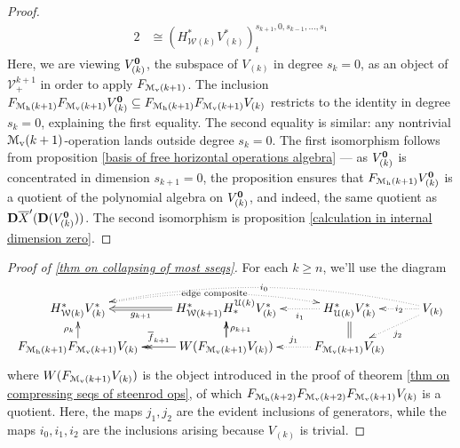 \documentclass[11pt]{amsart}
\theoremstyle{plain}
\theoremstyle{definition}
\newcommand{\calW}{\mathcal{W}}
\newcommand{\calU}{\mathcal{U}}
\newcommand{\calV}{\mathcal{V}}
\newcommand{\calM}{\mathcal{M}}
\newcommand{\calMv}{\mathcal{M}_\textup{v}}
\newcommand{\calMh}{\mathcal{M}_\textup{h}}
\theoremstyle{plain}
\newcommand{\vect}[2]{\calV^{#1}_{#2}}
\newcommand{\UEAX}{\overline{X}'}%
\newcommand{\dual}{\mathbf{D}}
\begin{document}
\begin{Calculations of HWn for n nonzero}
\begin{proof}
\begin{alignat*}{2}
&\cong (H^*_{\calW(k)}V^*_{(k)})^{s_{k+1},0,s_{k-1},\ldots,s_1}_{t}
\end{alignat*}
Here, we are viewing $V_{(k)}^{\textbf{\textup{0}}}$, the subspace of $V_{(k)}$ in degree $s_k=0$, as an object of $\vect{k+1}{+}$ in order to apply $F_{\calMv(k+1)}$. The inclusion $F_{\calM_{\textup{h}}(k+1)}F_{\calM_{\textup{v}}(k+1)}V_{(k)}^{\textbf{\textup{0}}}\subseteq F_{\calM_{\textup{h}}(k+1)}F_{\calM_{\textup{v}}(k+1)}V_{(k)}$ restricts to the identity in degree $s_k=0$, explaining the first equality. The second equality is similar: any nontrivial $\calMv(k+1)$-operation lands outside degree $s_k=0$. The first isomorphism follows from proposition \ref{basis of free horizontal operations algebra} --- as $V_{(k)}^{\textbf{\textup{0}}}$ is concentrated in dimension $s_{k+1}=0$, the proposition ensures that $F_{\calM_{\textup{h}}(k+1)}V_{(k)}^{\textbf{\textup{0}}}$ is a quotient of the polynomial algebra on $V_{(k)}^{\textbf{\textup{0}}}$, and indeed, the same quotient as $\dual\UEAX(\dual(V_{(k)}^{\textbf{\textup{0}}}))$. The second isomorphism is proposition \ref{calculation in internal dimension zero}.
\end{proof}
\begin{proof}[Proof of \ref{thm on collapsing of most sseqs}]
For each $k\geq n$, we'll use the diagram
\[\xymatrix@R=4mm{
H^*_{\calW(k)}V^*_{(k)}\ar@{..>}@/^1.22em/[rr]|-{\textup{\,edge composite\,}}
&H^*_{\calW(k+1)}H_*^{\calU(k)}V^*_{(k)}\ar@{=>}[l]^-{g_{k+1}}%
&H^*_{\calU(k)}V^*_{(k)}\ar@{..>}[l]^-{i_1}
&V_{(k)}\ar@{..>}[l]|-{\,i_2\,}\ar@{..>}[ld]^-{j_2}\ar@{..>}@/_1.72em/[lll]|-{\,i_0\,}
\\
F_{\calM_{\textup{h}}(k+1)}F_{\calM_{\textup{v}}(k+1)}V_{(k)}\ar[u]^-{\rho_k}
&W(F_{\calMv(k+1)}V_{(k)})\ar[u]\ar@{->>}[l]_-{\overline{f}_{k+1}}\ar[u]_-{\rho_{k+1}}
&F_{\calMv(k+1)}V_{(k)}\ar@{..>}[l]_-{j_1}\ar@{=}[u]%
}\]
where $W(F_{\calMv(k+1)}V_{(k)})$ is the object introduced in the proof of theorem \ref{thm on compressing seqs of steenrod ops}, of which $F_{\calM_{\textup{h}}(k+2)}F_{\calM_{\textup{v}}(k+2)}F_{\calMv(k+1)}V_{(k)}$ is a quotient. Here, the maps $j_1,j_2$ are the evident inclusions of generators, while the maps $i_0,i_1,i_2$ are the inclusions arising because $V_{(k)}$ is trivial.


\end{proof}
\end{Calculations of HWn for n nonzero}
\end{document}
